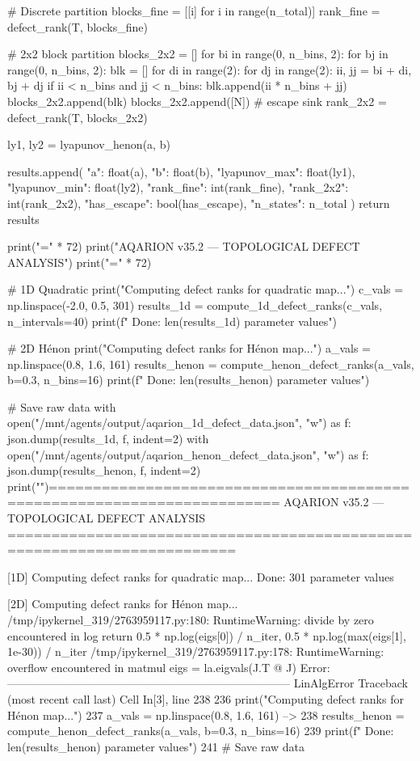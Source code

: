 {{{{{{{{{{{{{        # Discrete partition
        blocks_fine = [[i] for i in range(n_total)]
        rank_fine = defect_rank(T, blocks_fine)
        
        # 2x2 block partition
        blocks_2x2 = []
        for bi in range(0, n_bins, 2):
            for bj in range(0, n_bins, 2):
                blk = []
                for di in range(2):
                    for dj in range(2):
                        ii, jj = bi + di, bj + dj
                        if ii < n_bins and jj < n_bins:
                            blk.append(ii * n_bins + jj)
                blocks_2x2.append(blk)
        blocks_2x2.append([N])  # escape sink
        rank_2x2 = defect_rank(T, blocks_2x2)
        
        ly1, ly2 = lyapunov_henon(a, b)
        
        results.append({
            "a": float(a),
            "b": float(b),
            "lyapunov_max": float(ly1),
            "lyapunov_min": float(ly2),
            "rank_fine": int(rank_fine),
            "rank_2x2": int(rank_2x2),
            "has_escape": bool(has_escape),
            "n_states": n_total
        })
    return results


print("=" * 72)
print("AQARION v35.2 — TOPOLOGICAL DEFECT ANALYSIS")
print("=" * 72)

# 1D Quadratic
print("\n[1D] Computing defect ranks for quadratic map...")
c_vals = np.linspace(-2.0, 0.5, 301)
results_1d = compute_1d_defect_ranks(c_vals, n_intervals=40)
print(f"  Done: {len(results_1d)} parameter values")

# 2D Hénon
print("\n[2D] Computing defect ranks for Hénon map...")
a_vals = np.linspace(0.8, 1.6, 161)
results_henon = compute_henon_defect_ranks(a_vals, b=0.3, n_bins=16)
print(f"  Done: {len(results_henon)} parameter values")

# Save raw data
with open("/mnt/agents/output/aqarion_1d_defect_data.json", "w") as f:
    json.dump(results_1d, f, indent=2)
with open("/mnt/agents/output/aqarion_henon_defect_data.json", "w") as f:
    json.dump(results_henon, f, indent=2)
print("")========================================================================
AQARION v35.2 — TOPOLOGICAL DEFECT ANALYSIS
========================================================================

[1D] Computing defect ranks for quadratic map...
Done: 301 parameter values

[2D] Computing defect ranks for Hénon map...
/tmp/ipykernel_319/2763959117.py:180: RuntimeWarning: divide by zero encountered in log
  return 0.5 * np.log(eigs[0]) / n_iter, 0.5 * np.log(max(eigs[1], 1e-30)) / n_iter
/tmp/ipykernel_319/2763959117.py:178: RuntimeWarning: overflow encountered in matmul
  eigs = la.eigvals(J.T @ J)
Error:
---------------------------------------------------------------------------
LinAlgError                               Traceback (most recent call last)
Cell In[3], line 238
    236 print("\n[2D] Computing defect ranks for Hénon map...")
    237 a_vals = np.linspace(0.8, 1.6, 161)
--> 238 results_henon = compute_henon_defect_ranks(a_vals, b=0.3, n_bins=16)
    239 print(f"  Done: {len(results_henon)} parameter values")
    241 # Save raw data

}}}}}}}}}}}}}
